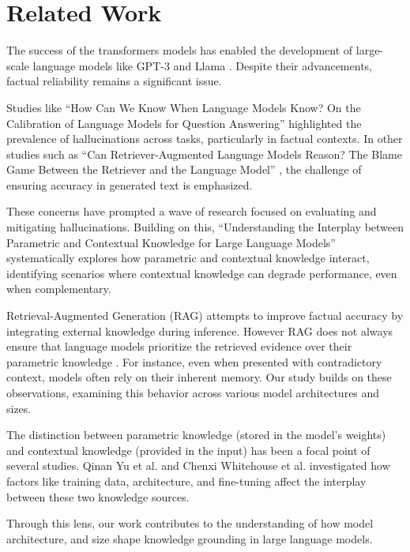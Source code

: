 \section{Related Work}

The success of the transformers models \cite{attention_is_all_you_need} has enabled the development of large-scale language models like GPT-3 \cite{gpt3} and Llama \cite{llama}.
Despite their advancements, factual reliability remains a significant issue.

Studies like ``How Can We Know When Language Models Know? On the Calibration of Language Models for Question Answering'' \cite{how_can_we_know} highlighted the prevalence of hallucinations across tasks, particularly in factual contexts.
In other studies such as ``Can Retriever-Augmented Language Models Reason? The Blame Game Between the Retriever and the Language Model'' \cite{can_rag_models_reason}, the challenge of ensuring accuracy in generated text is emphasized.

These concerns have prompted a wave of research focused on evaluating and mitigating hallucinations.
Building on this, ``Understanding the Interplay between Parametric and Contextual Knowledge for Large Language Models'' \cite{understanding_the_interplay} systematically explores how parametric and contextual knowledge interact, identifying scenarios where contextual knowledge can degrade performance, even when complementary.

Retrieval-Augmented Generation (RAG) \cite{rag} attempts to improve factual accuracy by integrating external knowledge during inference.
However RAG does not always ensure that language models prioritize the retrieved evidence over their parametric knowledge \cite{ragged,factual_recall}.
For instance, even when presented with contradictory context, models often rely on their inherent memory.
Our study builds on these observations, examining this behavior across various model architectures and sizes.

The distinction between parametric knowledge (stored in the model's weights) and contextual knowledge (provided in the input) has been a focal point of several studies.
Qinan Yu et al. \cite{factual_recall} and Chenxi Whitehouse et al. \cite{knowledge_grounding_retrieval_augmented} investigated how factors like training data, architecture, and fine-tuning affect the interplay between these two knowledge sources.

Through this lens, our work contributes to the understanding of how model architecture, and size shape knowledge grounding in large language models.
